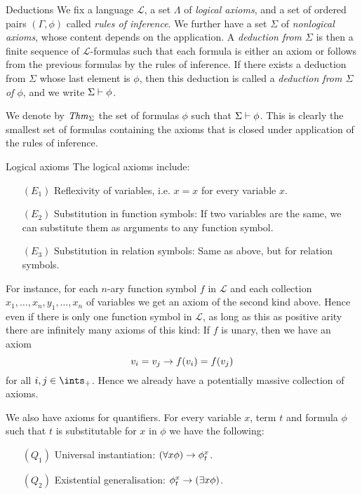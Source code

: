 \documentclass[article, a4paper, 11pt, oneside]{memoir}
\numberwithin{equation}{chapter}
\newcommand{\calL}{\mathcal{L}}
\theoremstyle{nonumberplain}
\begin{document}
\begin{notelist}
    \item[Deductions]
    We fix a language $\calL$, a set $\Lambda$ of \emph{logical axioms}, and a set of ordered pairs $(\Gamma,\phi)$ called \emph{rules of inference}. We further have a set $\Sigma$ of \emph{nonlogical axioms}, whose content depends on the application. A \emph{deduction from $\Sigma$} is then a finite sequence of $\calL$-formulas such that each formula is either an axiom or follows from the previous formulas by the rules of inference. If there exists a deduction from $\Sigma$ whose last element is $\phi$, then this deduction is called a \emph{deduction from $\Sigma$ of $\phi$}, and we write $\Sigma \vdash \phi$.

    We denote by $\mathit{Thm}_{\Sigma}$ the set of formulas $\phi$ such that $\Sigma \vdash \phi$. This is clearly the smallest set of formulas containing the axioms that is closed under application of the rules of inference.

    \item[Logical axioms]
    The logical axioms include:
    \begin{enumerate}
        \item[$(E_1)$] Reflexivity of variables, i.e. $x = x$ for every variable $x$.
        \item[$(E_2)$] Substitution in function symbols: If two variables are the same, we can substitute them as arguments to any function symbol.
        \item[$(E_3)$] Substitution in relation symbols: Same as above, but for relation symbols.
    \end{enumerate}
    For instance, for each $n$-ary function symbol $f$ in $\calL$ and each collection $x_1, \ldots, x_n, y_1, \ldots, x_n$ of variables we get an axiom of the second kind above. Hence even if there is only one function symbol in $\calL$, as long as this as positive arity there are infinitely many axioms of this kind: If $f$ is unary, then we have an axiom
    \begin{equation*}
        v_i = v_j \rightarrow f(v_i) = f(v_j)
    \end{equation*}
    for all $i,j \in \ints_+$. Hence we already have a potentially massive collection of axioms.

    We also have axioms for quantifiers. For every variable $x$, term $t$ and formula $\phi$ such that $t$ is substitutable for $x$ in $\phi$ we have the following:
    \begin{enumerate}
        \item[$(Q_1)$] Universal instantiation: $(\forall x \phi) \rightarrow \phi^x_t$.
        \item[$(Q_2)$] Existential generalisation: $\phi^x_t \rightarrow (\exists x \phi)$.
    \end{enumerate}


\end{notelist}
\end{document}
